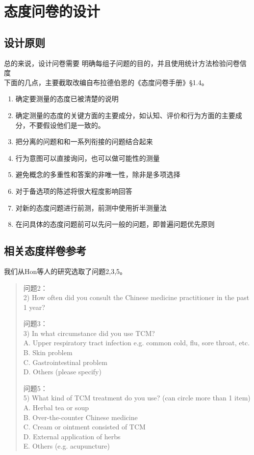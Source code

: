 \documentclass{ctexart}
\begin{document}
\section{态度问卷的设计}
\subsection{设计原则}
总的来说，设计问卷需要
明确每组子问题的目的，并且使用统计方法检验问卷信度\\

下面的几点，主要截取改编自布拉德伯恩的《态度问卷手册》\S1.4。\cite{bld2011}\\

\begin{enumerate}
\item 确定要测量的态度已被清楚的说明
\item 确定测量的态度的关键方面的主要成分，如认知、评价和行为方面的主要成分，不要假设他们是一致的。
\item 把分离的问题和和一系列衔接的问题结合起来
\item 行为意图可以直接询问，也可以做可能性的测量
\item 避免概念的多重性和答案的非唯一性，除非是多项选择
\item 对于备选项的陈述将很大程度影响回答
\item 对新的态度问题进行前测，前测中使用折半测量法
\item 在问具体的态度问题前可以先问一般的问题，即普遍问题优先原则
\end{enumerate}
\newpage

\subsection{相关态度样卷参考}
我们从Hon等人的研究\cite{kam2005}选取了问题2,3,5。

\begin{quote}
	问题2：\\
	2) How often did you consult the Chinese medicine practitioner in the past 1 year?
	
	问题3：\\
	3) In what circumstance did you use TCM?\\
	A. Upper respiratory tract infection e.g. common cold, flu, sore throat, etc.\\
	B. Skin problem\\
	C. Gastrointestinal problem\\
	D. Others (please specify)
	
	问题5：\\
	5) What kind of TCM treatment do you use? (can circle more than 1 item)
	A. Herbal tea or soup\\
	B. Over-the-counter Chinese medicine\\
	C. Cream or ointment consisted of TCM\\
	D. External application of herbs\\
	E. Others (e.g. acupuncture) 
\end{quote}
\end{document}
